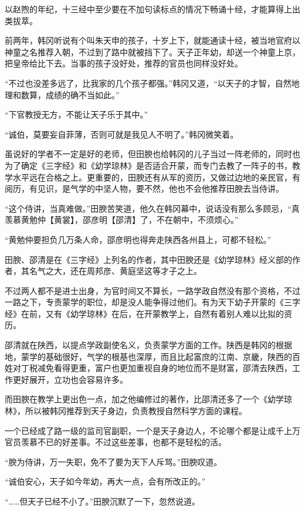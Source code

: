 以赵煦的年纪，十三经中至少要在不加句读标点的情况下畅诵十经，才能算得上出类拔萃。

前两年，韩冈听说有个叫朱天申的孩子，十岁上下，就能通读十经，被当地官府以神童之名推荐入朝，不过到了路中就被挡下了。天子正年幼，却送一个神童上京，把皇帝给比下去。当事的孩子没好处，推荐的官员也同样没好处。

“不过也没差多远了，比我家的几个孩子都强。”韩冈又道，“以天子的才智，自然地理和数算，成绩的确不当如此。”

“下官教授无方，不能让天子乐于其中。”

“诚伯，莫要妄自菲薄，否则可就是我见人不明了。”韩冈微笑着。

虽说好的学者不一定是好的老师，但田腴也给韩冈的儿子当过一阵老师的，同时也为了确定《三字经》和《幼学琼林》是否适合开蒙，而专门去教了一阵子的书，教学水平远在合格之上。更重要的，田腴还有从军的资历，又做过边地的亲民官，有阅历，有见识，是气学的中坚人物，要不然，他也不会他推荐田腴去当侍讲。

“这个侍讲，当真难做。”田腴苦笑道，他久在韩冈幕中，说话没有那么多顾忌，“真羡慕黄勉仲【黄裳】，邵彦明【邵清】了，不在朝中，不须烦心。”

“黄勉仲要担负几万条人命，邵彦明也得奔走陕西各州县上，可都不轻松。”

田腴、邵清是在《三字经》上列名的作者，其中田腴还是《幼学琼林》经义部的作者，其名气之大，还在周邦彦、黄庭坚这等才子之上。

不过两人都不是进士出身，为官时间又不算长，一路学政自然没有那个资格，不过一路之下，专责蒙学的职位，却是没人能争得过他们。有为天下幼子开蒙的《三字经》在前，又有《幼学琼林》在后，在开蒙教学上，自然有着别人难以比拟的资历。

邵清就在陕西，以提点学政副使名义，负责蒙学方面的工作。陕西是韩冈的根据地，蒙学的基础很好，气学的根基也深厚，而且比起富庶的江南、京畿，陕西的百姓对丁税减免看得更重，富户也更加重视自身的地位而不是财富，邵清去陕西，工作更好展开，立功也会容易许多。

而田腴在教学上更出色一点，加之他编修过的著作，比邵清还多了一个《幼学琼林》，所以被韩冈推荐到天子身边，负责教授自然科学方面的课程。

一个已经成了路一级的监司官副职，一个是天子身边人，不论哪个都是让成千上万官员羡慕不已的好差事。不过这些差事，也都不是轻松的活。

“腴为侍讲，万一失职，免不了要为天下人斥骂。”田腴叹道。

“诚伯安心，天子如今年幼，再大一点，会有所改正的。”

“……但天子已经不小了。”田腴沉默了一下，忽然说道。

